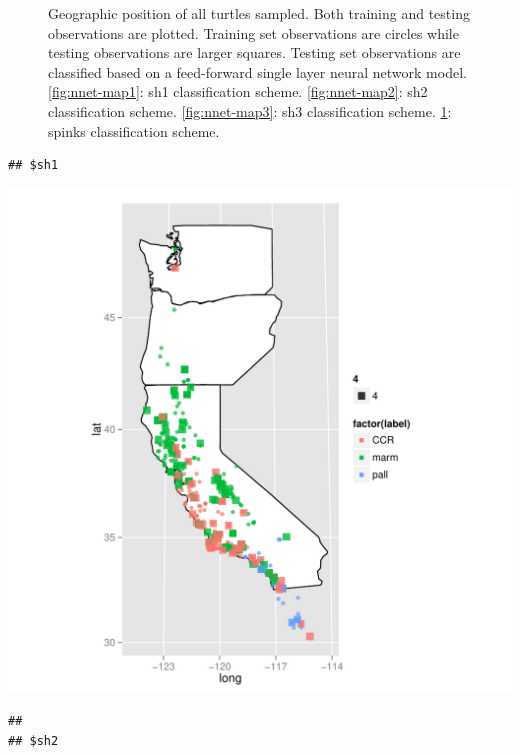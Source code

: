 \documentclass{article}\usepackage{graphicx, color}
\makeatletter
\def\maxwidth{ %
  \ifdim\Gin@nat@width>\linewidth
    \linewidth
  \else
    \Gin@nat@width
  \fi
}
\newenvironment{kframe}{%
 \def\at@end@of@kframe{}%
 \ifinner\ifhmode%
  \def\at@end@of@kframe{\end{minipage}}%
  \begin{minipage}{\columnwidth}%
 \fi\fi%
 \def\FrameCommand##1{\hskip\@totalleftmargin \hskip-\fboxsep
 \colorbox{shadecolor}{##1}\hskip-\fboxsep
     \hskip-\linewidth \hskip-\@totalleftmargin \hskip\columnwidth}%
 \MakeFramed {\advance\hsize-\width
   \@totalleftmargin\z@ \linewidth\hsize
   \@setminipage}}%
 {\par\unskip\endMakeFramed%
 \at@end@of@kframe}
\newenvironment{knitrout}{}{} %
\makeatother
\begin{document}
\begin{figure}[t]
\begin{subfigure}[b]{0.5\textwidth}
    \label{fig:nnet-map4}
  \end{subfigure}
  \caption{Geographic position of all turtles sampled. Both training and testing observations are plotted. Training set observations are circles while testing observations are larger squares. Testing set observations are classified based on a feed-forward single layer neural network model. \ref{fig:nnet-map1}: sh1 classification scheme. \ref{fig:nnet-map2}: sh2 classification scheme. \ref{fig:nnet-map3}: sh3 classification scheme. \ref{fig:nnet-map4}: spinks classification scheme.}
  \label{fig:nnet-map}
\end{figure}


\begin{knitrout}
\color{fgcolor}\begin{kframe}
\begin{verbatim}
## $sh1
\end{verbatim}
\end{kframe}
\includegraphics[width=\maxwidth]{figure/rf-map1} 
\begin{kframe}\begin{verbatim}
## 
## $sh2
\end{verbatim}
\end{kframe}

\end{knitrout}
\end{document}
